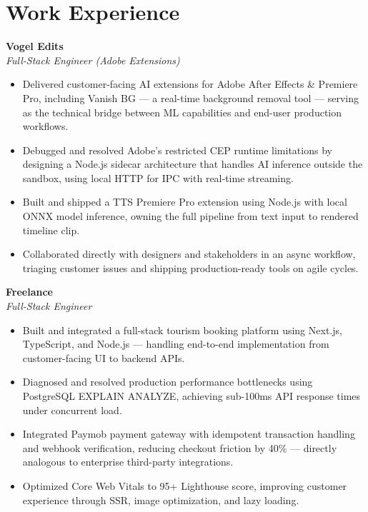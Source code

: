 \documentclass[11pt]{article}
\begin{document}
\section{Work Experience}
\textbf{Vogel Edits} \\
\textit{Full-Stack Engineer (Adobe Extensions)}\\\begin{itemize}
\item Delivered customer-facing AI extensions for Adobe After Effects \& Premiere Pro, including Vanish BG — a real-time background removal tool — serving as the technical bridge between ML capabilities and end-user production workflows.
\item Debugged and resolved Adobe's restricted CEP runtime limitations by designing a Node.js sidecar architecture that handles AI inference outside the sandbox, using local HTTP for IPC with real-time streaming.
\item Built and shipped a TTS Premiere Pro extension using Node.js with local ONNX model inference, owning the full pipeline from text input to rendered timeline clip.
\item Collaborated directly with designers and stakeholders in an async workflow, triaging customer issues and shipping production-ready tools on agile cycles.
\end{itemize}

\textbf{Freelance} \\
\textit{Full-Stack Engineer}\\\begin{itemize}
\item Built and integrated a full-stack tourism booking platform using Next.js, TypeScript, and Node.js — handling end-to-end implementation from customer-facing UI to backend APIs.
\item Diagnosed and resolved production performance bottlenecks using PostgreSQL EXPLAIN ANALYZE, achieving sub-100ms API response times under concurrent load.
\item Integrated Paymob payment gateway with idempotent transaction handling and webhook verification, reducing checkout friction by 40\% — directly analogous to enterprise third-party integrations.
\item Optimized Core Web Vitals to 95+ Lighthouse score, improving customer experience through SSR, image optimization, and lazy loading.
\end{itemize}
\end{document}
